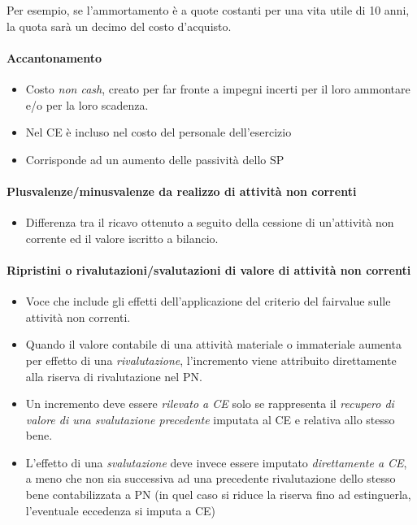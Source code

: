 Per esempio, se l'ammortamento è a quote costanti per una vita utile
di 10 anni, la quota sarà un decimo del costo d'acquisto.

\paragraph{Accantonamento}
\begin{itemize}
    \item Costo \emph{non cash}, creato per far fronte a impegni incerti per il loro ammontare e/o per la
    loro scadenza.
    \item Nel CE è incluso nel costo del personale dell’esercizio
    \item Corrisponde ad un aumento delle passività dello SP
\end{itemize}

\paragraph{Plusvalenze/minusvalenze da realizzo di attività non correnti}
\begin{itemize}
    \item Differenza tra il ricavo ottenuto a seguito della cessione di un’attività non corrente ed il
    valore iscritto a bilancio.
\end{itemize}

\paragraph{Ripristini o rivalutazioni/svalutazioni di valore di attività non correnti}
\begin{itemize}
    \item Voce che include gli effetti dell’applicazione del criterio del \gls{fairvalue} sulle
    attività non correnti.
    \item Quando il valore contabile di una attività materiale o immateriale aumenta
    per effetto di una \emph{rivalutazione}, l’incremento viene attribuito
    direttamente alla riserva di rivalutazione nel PN.
    \item Un incremento deve essere \emph{rilevato a CE} solo se rappresenta il
    \emph{recupero di valore di una svalutazione precedente} imputata al
    CE e relativa allo stesso bene.
    \item L’effetto di una \emph{svalutazione} deve invece essere imputato \emph{direttamente
    a CE}, a meno che non sia successiva ad una precedente rivalutazione
    dello stesso bene contabilizzata a PN (in quel caso si riduce la riserva
    fino ad estinguerla, l’eventuale eccedenza si imputa a CE) 
\end{itemize}

